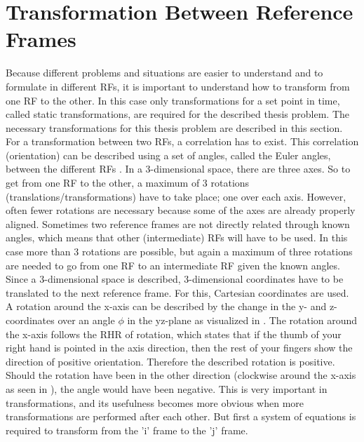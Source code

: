 \section{Transformation Between Reference Frames}
\label{sec:transfram}
Because different problems and situations are easier to understand and to formulate in different \ac{RF}s, it is important to understand how to transform from one \ac{RF} to the other. In this case only transformations for a set point in time, called static transformations, are required for the described thesis problem. The necessary transformations for this thesis problem are described in this section.\\
For a transformation between two \ac{RF}s, a correlation has to exist. This correlation (orientation) can be described using a set of angles, called the Euler angles, between the different \ac{RF}s \citep{mooij2013stat}. In a 3-dimensional space, there are three axes. So to get from one \ac{RF} to the other, a maximum of 3 rotations (translations/transformations) have to take place; one over each axis. However, often fewer rotations are necessary because some of the axes are already properly aligned. Sometimes two reference frames are not directly related through known angles, which means that other (intermediate) \ac{RF}s will have to be used. In this case more than 3 rotations are possible, but again a maximum of three rotations are needed to go from one \ac{RF} to an intermediate \ac{RF} given the known angles. Since a 3-dimensional space is described, 3-dimensional coordinates have to be translated to the next reference frame. For this, Cartesian coordinates are used. A rotation around the x-axis can be described by the change in the y- and z-coordinates over an angle $\phi$ in the yz-plane as visualized in . The rotation around the x-axis follows the \ac{RHR} of rotation, which states that if the thumb of your right hand is pointed in the axis direction, then the rest of your fingers show the direction of positive orientation. Therefore the described rotation is positive. Should the rotation have been in the other direction (clockwise around the x-axis as seen in ), the angle would have been negative. This is very important in transformations, and its usefulness becomes more obvious when more transformations are performed after each other. But first a system of equations is required to transform from the 'i' frame to the 'j' frame. 





